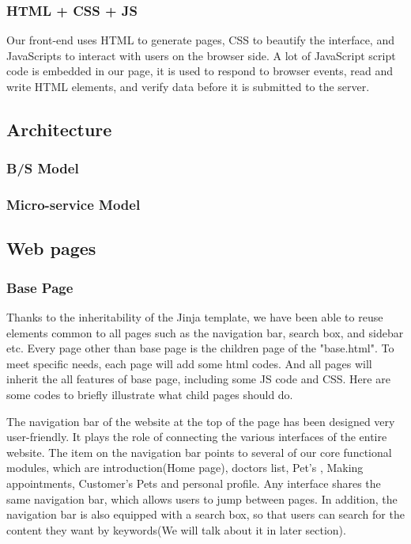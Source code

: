 \documentclass[a4paper]{article}
\begin{document}
\subsubsection{HTML + CSS + JS }
Our front-end uses HTML to generate pages, CSS to beautify the interface, and JavaScripts to interact with users on the browser side. A lot of JavaScript script code is embedded in our page, it is used to respond to browser events, read and write HTML elements, and verify data before it is submitted to the server. 
\subsection{Architecture}
\subsubsection{B/S Model}
\subsubsection{Micro-service Model}
\subsection{Web pages}
\subsubsection{Base Page}
Thanks to the inheritability of the Jinja template, we have been able to reuse elements common to all pages such as the navigation bar, search box, and sidebar etc. Every page other than base page is the children page of the "base.html". To meet specific needs, each page will add some html codes. And all pages will inherit the all features of base page, including some JS code and CSS. Here are some codes to briefly illustrate what child pages should do. 

The navigation bar of the website at the top of the page has been designed very user-friendly. It plays the role of connecting the various interfaces of the entire website. The item on the navigation bar points to several of our core functional modules, which are introduction(Home page), doctors list, Pet's , Making appointments, Customer's Pets and personal profile. Any interface shares the same navigation bar, which allows users to jump between pages. In addition, the navigation bar is also equipped with a search box, so that users can search for the content they want by keywords(We will talk about it in later section).
\end{document}
